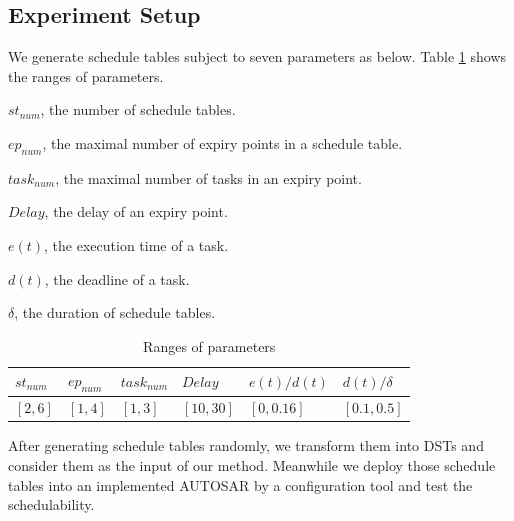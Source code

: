\documentclass[conference]{IEEEtran}
\begin{document}
\subsection{Experiment Setup}
We generate schedule tables subject to seven parameters as below. Table \ref{range} shows the ranges of parameters. 

\begin{compactitem}
  \item $st_{num}$, the number of schedule tables.
  \item $ep_{num}$, the maximal number of expiry points in a schedule table.
  \item $task_{num}$, the maximal number of tasks in an expiry point.
  \item $Delay$, the delay of an expiry point.
  \item $e(t)$, the execution time of a task.
  \item $d(t)$, the deadline of a task.
  \item $\delta$, the duration of schedule tables.
\end{compactitem}
\begin{table}[htbp]
  \centering
  \begin{tabular}{llllll}
    \toprule
    $st_{num}$ & $ep_{num}$ & $task_{num}$ & $Delay$ & $e(t)/d(t)$ & $d(t)/\delta$\\
    \midrule
    $[2,6]$&$[1,4]$&$[1,3]$&$[10,30]$&$[0,0.16]$&$[0.1,0.5]$\\
    \bottomrule
  \end{tabular}
  \caption{Ranges of parameters}\label{range}
\end{table}

After generating schedule tables randomly, we transform them into DSTs and consider them as the input of our method. Meanwhile we deploy those schedule tables into an implemented AUTOSAR by a configuration tool and test the schedulability. 

\end{document}
